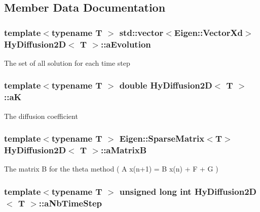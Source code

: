 \subsection{Member Data Documentation}
\hypertarget{classHyDiffusion2D_aaba7bf56f39cc0caa9bcf8fa4b2f30f0}{
\subsubsection[{aEvolution}]{\setlength{\rightskip}{0pt plus 5cm}template$<$typename T $>$ std::vector$<$Eigen::VectorXd$>$ {\bf HyDiffusion2D}$<$ T $>$::{\bf aEvolution}}}
\label{classHyDiffusion2D_aaba7bf56f39cc0caa9bcf8fa4b2f30f0}
The set of all solution for each time step \hypertarget{classHyDiffusion2D_adb712ad9fbd8ff8ba019bd0a5c80edb4}{
\subsubsection[{aK}]{\setlength{\rightskip}{0pt plus 5cm}template$<$typename T $>$ double {\bf HyDiffusion2D}$<$ T $>$::{\bf aK}}}
\label{classHyDiffusion2D_adb712ad9fbd8ff8ba019bd0a5c80edb4}
The diffusion coefficient \hypertarget{classHyDiffusion2D_a3826559f9dade45395fc0bb046fbab9c}{
\subsubsection[{aMatrixB}]{\setlength{\rightskip}{0pt plus 5cm}template$<$typename T $>$ Eigen::SparseMatrix$<$T$>$ {\bf HyDiffusion2D}$<$ T $>$::{\bf aMatrixB}}}
\label{classHyDiffusion2D_a3826559f9dade45395fc0bb046fbab9c}
The matrix B for the theta method ( A x(n+1) = B x(n) + F + G ) \hypertarget{classHyDiffusion2D_a3fdb9b91352535d51ab737c8e2bbb096}{
\subsubsection[{aNbTimeStep}]{\setlength{\rightskip}{0pt plus 5cm}template$<$typename T $>$ unsigned long int {\bf HyDiffusion2D}$<$ T $>$::{\bf aNbTimeStep}}}
